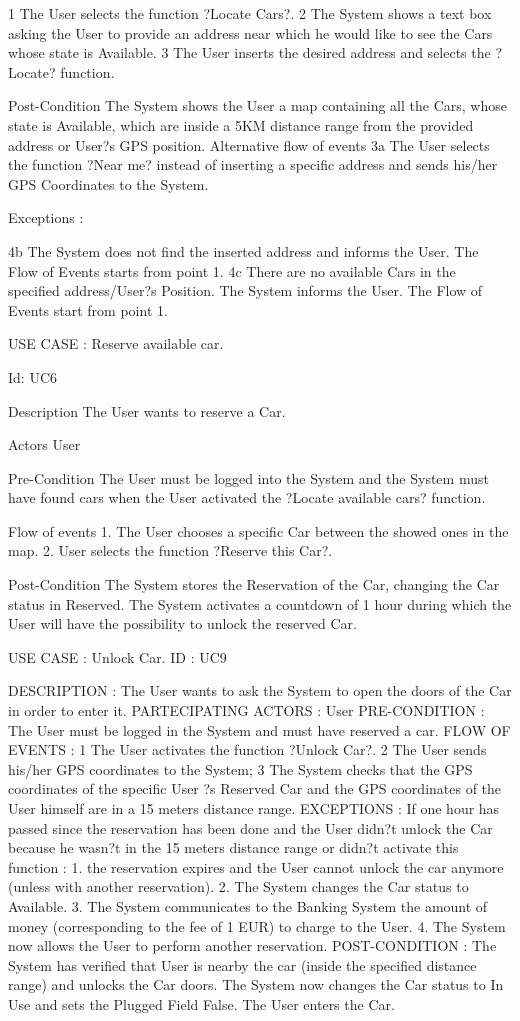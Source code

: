1 The User selects the function ?Locate Cars?.
2 The System shows a text box asking the User to provide an address near which he would like to see the Cars whose state is Available.
3 The User inserts the desired address and selects the ?Locate? function.

Post-Condition
The System shows the User a map containing all the Cars, whose state is Available, which are inside a 5KM distance range from the provided address or User?s GPS position.
Alternative flow of events
3a 	The User selects the function ?Near me? instead of inserting a specific address and sends his/her GPS Coordinates to the System.

Exceptions :

4b	The System does not find the inserted address and informs the User. The Flow of Events starts from point 1.
4c	There are no available Cars in the specified address/User?s Position. The System informs the User. The Flow of Events start from point 1.

		
USE CASE : Reserve available car.


Id:  UC6


Description
The User wants to reserve a Car.

Actors
User

Pre-Condition
The User must be logged into the System and the System must have found cars when the User activated the ?Locate available cars? function. 


Flow of events
1. The User chooses a specific Car between the showed ones in the map.
2. User selects the function ?Reserve this Car?.

Post-Condition
The System stores the Reservation of the Car, changing the Car status in Reserved.
The System activates a countdown of 1 hour during which the User will have the possibility to unlock the reserved Car.


USE CASE : Unlock Car.
ID : UC9

DESCRIPTION : The User wants to ask the System to open the doors of the Car in order  to enter it.
PARTECIPATING ACTORS : User  
PRE-CONDITION : The User must be logged in the System and must have reserved a car. 
FLOW OF EVENTS : 
1 The User activates the function ?Unlock Car?.
2 The User  sends his/her GPS coordinates to the System; 
3 The System checks that the GPS coordinates of the specific User ?s Reserved Car and the GPS coordinates of the User himself are in a 15 meters distance range. 
EXCEPTIONS :
If one hour has passed since the reservation has been done and the User didn?t unlock the Car because he wasn?t in the 15 meters distance range or didn?t activate this function :
1. the reservation expires and the User cannot unlock the car anymore (unless with another reservation). 
2. The System changes the Car status to Available.
3. The System communicates to the Banking System the amount of money (corresponding to the fee of 1 EUR) to charge to the User.
4. The System now allows the User to perform another reservation. 
POST-CONDITION :  
The System has verified that User is nearby the car (inside the specified distance range) and unlocks the Car doors. 
The System now changes the Car status to In Use and sets the Plugged Field False. 
The User enters the Car.



